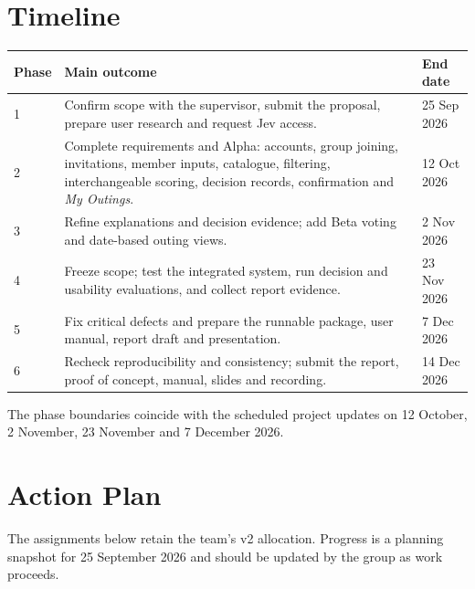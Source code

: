 \documentclass[12pt,a4paper]{article}
\begin{document}
\section*{Timeline}
\begin{longtable}{@{}p{}p{}p{}@{}}
  \toprule
  \textbf{Phase} & \textbf{Main outcome} & \textbf{End date} \\
  \midrule
  \endhead
  1 & Confirm scope with the supervisor, submit the proposal, prepare user research and request Jev access. & 25 Sep 2026 \\
  \midrule
  2 & Complete requirements and Alpha: accounts, group joining, invitations, member inputs, catalogue, filtering, interchangeable scoring, decision records, confirmation and \emph{My Outings}. & 12 Oct 2026 \\
  \midrule
  3 & Refine explanations and decision evidence; add Beta voting and date-based outing views. & 2 Nov 2026 \\
  \midrule
  4 & Freeze scope; test the integrated system, run decision and usability evaluations, and collect report evidence. & 23 Nov 2026 \\
  \midrule
  5 & Fix critical defects and prepare the runnable package, user manual, report draft and presentation. & 7 Dec 2026 \\
  \midrule
  6 & Recheck reproducibility and consistency; submit the report, proof of concept, manual, slides and recording. & 14 Dec 2026 \\
  \bottomrule
\end{longtable}
The phase boundaries coincide with the scheduled project updates on 12 October, 2 November, 23 November and 7 December 2026.

\section*{Action Plan}
The assignments below retain the team's v2 allocation. Progress is a planning snapshot for 25 September 2026 and should be updated by the group as work proceeds.
\end{document}
